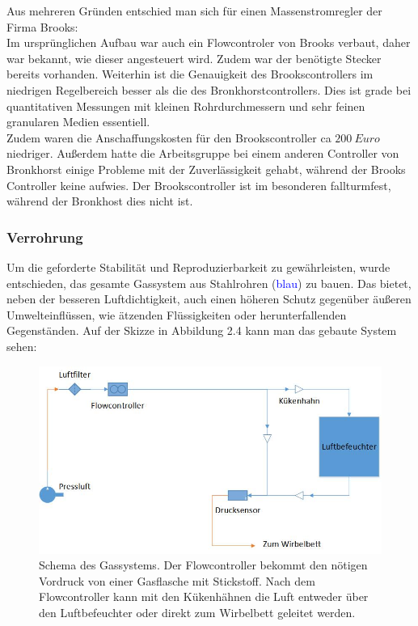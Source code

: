 Aus mehreren Gründen entschied man sich für einen Massenstromregler der Firma Brooks: \\
Im ursprünglichen Aufbau war auch ein Flowcontroler von Brooks verbaut, daher war bekannt, wie dieser angesteuert wird. Zudem war der benötigte Stecker bereits vorhanden. Weiterhin ist die Genauigkeit des Brookscontrollers im niedrigen Regelbereich besser als die des Bronkhorstcontrollers. Dies ist grade bei quantitativen Messungen mit kleinen Rohrdurchmessern und sehr feinen granularen Medien essentiell. \\
Zudem waren die Anschaffungskosten für den Brookscontroller ca $\SI{200}{Euro}$ niedriger. Außerdem hatte die Arbeitsgruppe bei einem anderen Controller von Bronkhorst einige Probleme mit der Zuverlässigkeit gehabt, während der Brooks Controller keine aufwies. Der Brookscontroller ist im besonderen fallturmfest, während der Bronkhost dies nicht ist.


\subsubsection{Verrohrung}

Um die geforderte Stabilität und Reproduzierbarkeit zu gewährleisten, wurde entschieden, das gesamte Gassystem aus Stahlrohren (\textcolor{blue}{blau}) zu bauen. Das bietet, neben der besseren Luftdichtigkeit, auch einen höheren Schutz gegenüber äußeren Umwelteinflüssen, wie ätzenden Flüssigkeiten oder herunterfallenden Gegenständen.
Auf der Skizze in Abbildung 2.4 kann man das gebaute System sehen:
\hfill \\

\begin{figure}[h!]
	\begin{center}
		\includegraphics[scale=0.6]{Aufbau_Gassystem.jpg}
		\caption[Schema Gassystem]{Schema des Gassystems. Der Flowcontroller bekommt den nötigen Vordruck von einer Gasflasche mit Stickstoff. Nach dem Flowcontroller kann mit den Kükenhähnen die Luft entweder über den Luftbefeuchter oder direkt zum Wirbelbett geleitet werden.}
	\end{center}
\end{figure}


